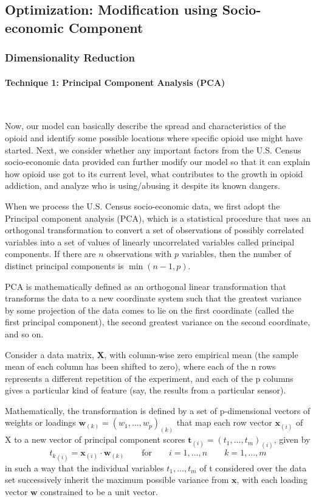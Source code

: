 \documentclass{mcmthesis}
\begin{document}
\subsection{Optimization: Modification using Socio-economic Component}\label{Sec:Optimazation}
\subsubsection{Dimensionality Reduction}

\paragraph{\textbf{Technique 1: Principal Component Analysis (PCA)}}

~\smallskip

Now, our model can basically describe the spread and characteristics of the opioid and identify some possible locations where specific opioid use might have started. Next, we consider whether any important factors from the U.S. Census socio-economic data provided can further modify our model so that it can explain how opioid use got to its current level, what contributes to the growth in opioid addiction, and analyze who is using/abusing it despite its known dangers.

When we process the U.S. Census socio-economic data, we first adopt  the Principal component analysis (PCA), which is a statistical procedure that uses an orthogonal transformation to convert a set of observations of possibly correlated variables into a set of values of linearly uncorrelated variables called principal components. If there are $n$ observations with $p$ variables, then the number of distinct principal components is $\min(n-1,p)$. 

PCA is mathematically defined as an orthogonal linear transformation that transforms the data to a new coordinate system such that the greatest variance by some projection of the data comes to lie on the first coordinate (called the first principal component), the second greatest variance on the second coordinate, and so on.

Consider a data matrix, $\mathbf{X}$, with column-wise zero empirical mean (the sample mean of each column has been shifted to zero), where each of the n rows represents a different repetition of the experiment, and each of the p columns gives a particular kind of feature (say, the results from a particular sensor).

Mathematically, the transformation is defined by a set of p-dimensional vectors of weights or loadings $ \mathbf {w} _{(k)}=(w_{1},\dots ,w_{p})_{(k)}$ that map each row vector $\mathbf{x}_{(i)}$ of X to a new vector of principal component scores $ \mathbf {t} _{(i)}=(t_{1},\dots ,t_{m})_{(i)}$, given by
$$ {t_{k}}_{(i)}=\mathbf {x} _{(i)}\cdot \mathbf {w} _{(k)}\qquad \mathrm {for} \qquad i=1,\dots ,n\qquad k=1,\dots ,m$$
in such a way that the individual variables $ t_{1},\dots ,t_{m}$ of t considered over the data set successively inherit the maximum possible variance from $\mathbf {x}$, with each loading vector $\mathbf {w}$ constrained to be a unit vector. \\
\end{document}
